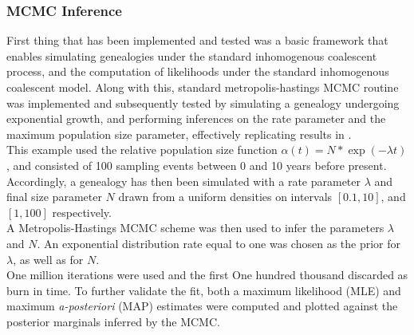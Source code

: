 \documentclass{ieeeaccess}
\theoremstyle{definition}
\begin{document}
\subsubsection{MCMC Inference}
First thing that has been implemented and tested was a basic framework that enables simulating genealogies under the standard inhomogenous coalescent process, and the computation of likelihoods under the standard inhomogenous coalescent model. Along with this, standard metropolis-hastings MCMC routine was implemented and subsequently tested by simulating a genealogy undergoing exponential growth, and performing inferences on the rate parameter and the maximum population size parameter, effectively replicating results in \cite{drummond_estimating_2002}.\\
This example used the relative population size function $\alpha(t) = N*\exp(-\lambda t)$, and consisted of 100 sampling events between 0 and 10 years before present.
Accordingly, a genealogy has then been simulated with a rate parameter $\lambda$ and final size parameter $N$ drawn from a uniform densities on intervals $[0.1, 10]$, and $[1,100]$ respectively.\\
A Metropolis-Hastings MCMC scheme was then used to infer the parameters $\lambda$ and $N$. An exponential distribution rate equal to one was chosen as the prior for $\lambda$, as well as for $N$.\\
One million iterations were used and the first One hundred thousand discarded as burn in time. To further validate the fit, both a maximum likelihood (MLE) and maximum \textit{a-posteriori} (MAP) estimates were computed and plotted against the posterior marginals inferred by the MCMC.
\end{document}

